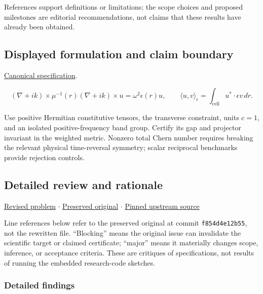 \documentclass[
  11pt,
]{article}
\begin{document}
References support definitions or limitations; the scope choices and
proposed milestones are editorial recommendations, not claims that these
results have already been obtained.

\subsection{Displayed formulation and claim boundary}

\href{https://github.com/rick-stevens-ai/Pure-Thought/blob/main/PRDs/11-Photonic-Topological-Crystals.md}{Canonical
specification}.

\[(\nabla+ik)\times\mu^{-1}(r)(\nabla+ik)\times u
=\omega^2\epsilon(r)u,\qquad
\langle u,v\rangle_\epsilon=\int_{\mathrm{cell}}u^*\cdot\epsilon v\,dr.\]

Use positive Hermitian constitutive tensors, the transverse constraint,
units \(c=1\), and an isolated positive-frequency band group. Certify
its gap and projector invariant in the weighted metric. Nonzero total
Chern number requires breaking the relevant physical time-reversal
symmetry; scalar reciprocal benchmarks provide rejection controls.

\subsection{Detailed review and rationale}

\href{https://github.com/rick-stevens-ai/Pure-Thought/blob/main/PRDs/11-Photonic-Topological-Crystals.md}{Revised
problem} \ensuremath{\cdot}
\href{https://github.com/rick-stevens-ai/Pure-Thought/blob/main/archive/original-PRDs/11-Photonic-Topological-Crystals.md}{Preserved
original} \ensuremath{\cdot}
\href{https://github.com/rick-stevens-ai/Pure-Thought/blob/f854d4e12b55c1f5b5c2a964b75f2d23496d981e/PRDs/11-Photonic-Topological-Crystals.md}{Pinned
upstream source}

Line references below refer to the preserved original at commit
\texttt{f854d4e12b55}, not the rewritten file. ``Blocking'' means the
original issue can invalidate the scientific target or claimed
certificate; ``major'' means it materially changes scope, inference, or
acceptance criteria. These are critiques of specifications, not results
of running the embedded research-code sketches.

\subsubsection{Detailed findings}
\end{document}
